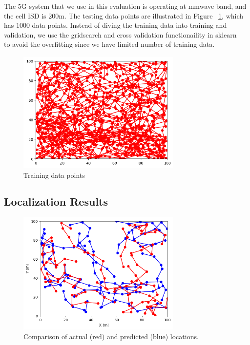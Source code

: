 \documentclass[conference, 10pt]{IEEEtran}
\begin{document}
The 5G system that we use in this evaluation is operating at mmwave band, and the cell ISD is 200m. The testing data points are illustrated in 
Figure ~\ref{fig:training}, which has 1000 data points. Instead of diving the training data into training and validation, we use the gridsearch and cross validation functionaility in 
sklearn ~\cite{sklearn} to avoid the overfitting since we have limited number of training data.

\begin{figure}[t]
	\begin{center}
	\includegraphics[height=2.4in,width=3.2in]{./GM_training.png}
	\caption{\label{fig:training}
	{\small Training data points}}
	\end{center}
	\end{figure}		

\subsection{Localization Results}


\begin{figure}[t]
\begin{center}
\includegraphics[height=2.4in,width=3.2in]{./Combined_path_illustration.png}
\caption{\label{fig:toyeg}
{\small Comparison of actual (red) and predicted (blue) locations.}}
\end{center}
\end{figure}
\end{document}

